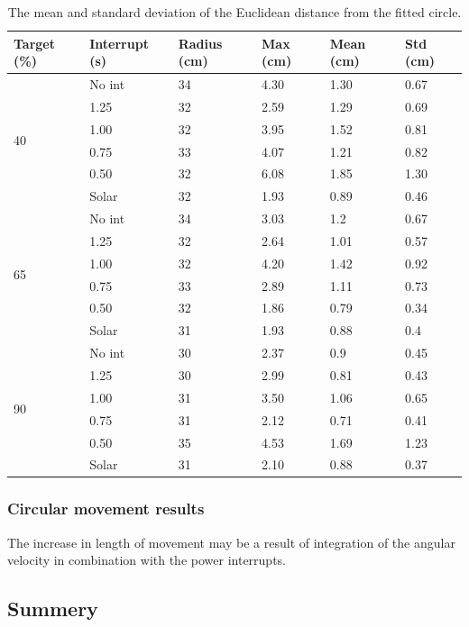 \begin{table}[t]
	\centering
	\caption{The mean and standard deviation of the Euclidean distance from the fitted circle.}
	\label{tab:circular_results}
	\begin{tabular}{|l|l||l|l|l|l|}
		\hline
		Target (\%) & Interrupt (s) & Radius (cm) & Max (cm) & Mean (cm) & Std (cm)\\
		\hline \hline
		\multirow{6}{*}{40} & No int & 34 & 4.30 & 1.30 & 0.67 \\
		& 1.25 & 32 & 2.59 & 1.29 & 0.69 \\
		& 1.00 & 32 & 3.95 & 1.52 & 0.81 \\
		& 0.75 & 33 & 4.07 & 1.21 & 0.82 \\
		& 0.50 & 32 & 6.08 & 1.85 & 1.30 \\
		& Solar & 32 & 1.93 & 0.89 & 0.46 \\
		\hline
		\multirow{6}{*}{65} & No int & 34 & 3.03 & 1.2 & 0.67 \\
		& 1.25 & 32 & 2.64 & 1.01 & 0.57 \\
		& 1.00 & 32 & 4.20 & 1.42 & 0.92 \\
		& 0.75 & 33 & 2.89 & 1.11 & 0.73 \\
		& 0.50 & 32 & 1.86 & 0.79 & 0.34 \\
		& Solar & 31 & 1.93 & 0.88 & 0.4 \\
		\hline
		\multirow{6}{*}{90} & No int & 30 & 2.37 & 0.9 & 0.45 \\
		& 1.25 & 30 & 2.99 & 0.81 & 0.43 \\
		& 1.00 & 31 & 3.50 & 1.06 & 0.65 \\
		& 0.75 & 31 & 2.12 & 0.71 & 0.41 \\
		& 0.50 & 35 & 4.53 & 1.69 & 1.23 \\
		& Solar & 31 & 2.10 & 0.88 & 0.37 \\
		\hline
	\end{tabular}
\end{table}

\subsubsection{Circular movement results}

The increase in length of movement may be a result of integration of the angular velocity in combination with the power interrupts.

\subsection{Summery}


